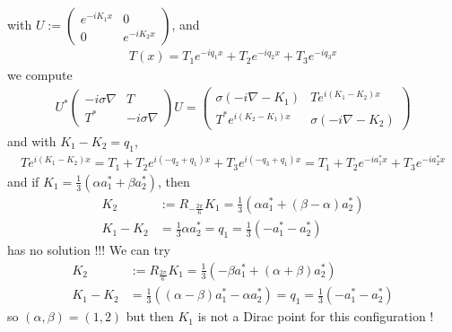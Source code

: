 \documentclass[11pt,a4paper,reqno,french,tikz]{amsart}
\newcommand{\pa}[1]{\left( #1 \right)} %
\newcommand{\na}{\nabla} %
\newcommand{\f}[2]{\frac{#1}{#2}} %
\newcommand{\mat}[1]{\begin{pmatrix} #1 \end{pmatrix}} %
\begin{document}
with $U := \mat{e^{-iK_1 x} & 0 \\ 0 & e^{-iK_2 x}}$, and
\begin{align*}
T(x) = T_1 e^{-iq_1 x}  +T_2 e^{-iq_2 x}  +T_3 e^{-iq_3 x} 
\end{align*}
we compute
\begin{align}\label{eq:UmatU}
	U^* \mat{-i\sigma \na & T \\ T^* & -i\sigma \na} U = \mat{\sigma\pa{-i\na - K_1} & T e^{i\pa{K_1 - K_2}x} \\ T^* e^{i\pa{K_2-K_1}x} & \sigma\pa{-i\na - K_2}} 
\end{align}
and with $K_1 - K_2 = q_1$,
\begin{align*}
T e^{i\pa{K_1 - K_2}x} = T_1 + T_2 e^{i\pa{-q_2+q_1}x} + T_3 e^{i\pa{-q_3+q_1}x} = T_1 + T_2 e^{-i a_1^* x} + T_3 e^{-ia_2^* x}
\end{align*}
 and if $K_1 = \f 13 \pa{\alpha a_1^* + \beta a_2^*}$, then 
\begin{align*}
	K_2 &:= R_{-\f{2\pi}{6}} K_1 = \f 13 \pa{\alpha a_1^* + \pa{\beta-\alpha}a_2^*} \\
K_1 - K_2 &= \f 13 \alpha a_2^* = q_1 = \f 13 \pa{-a_1^* - a_2 ^*}
\end{align*}
has no solution !!! We can try
\begin{align*}
	K_2 &:= R_{\f{2\pi}{6}} K_1 = \f 13 \pa{-\beta a_1^* + \pa{\alpha + \beta}a_2^*} \\
K_1 - K_2 &= \f 13 \pa{\pa{\alpha -\beta}a_1^* - \alpha a_2^*} = q_1 = \f 13 \pa{-a_1^* - a_2 ^*}
\end{align*}
so $(\alpha,\beta) = (1,2)$ but then $K_1$ is not a Dirac point for this configuration !




\end{document}
